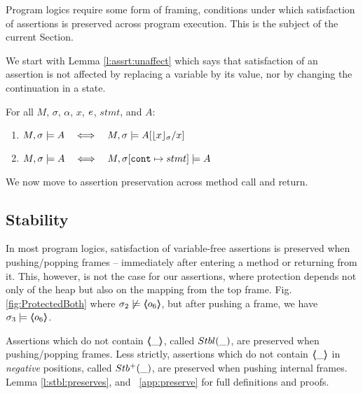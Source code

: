 Program logics require some form of framing, \ie conditions under which  satisfaction of  assertions is preserved across program execution. 
This is the subject of the current Section.

We start with  Lemma \ref{l:assrt:unaffect}  which says that satisfaction of an assertion is not affected by replacing a variable by its value, nor by changing the continuation in a state.


\begin{lemma}
\label{lemma:addr:expr}
\label{l:assrt:unaffect}
For all $M$, $\sigma$, $\alpha$, $x$, $\mathit{e}$, $stmt$, and $A$:

\begin{enumerate}
\item
\label{one:ad:exp}
\label{l:assrt:unaffect:one}
$\satisfiesA{M}{\sigma}{A}   \ \ \ \Longleftrightarrow\ \ \ \satisfiesA{M}{\sigma}{A[{\interpret \sigma x}/x]}   $ 
\item
$ \satisfiesA{M}{\sigma}{A}   \ \ \ \Longleftrightarrow\ \ \ \satisfiesA{M}{\sigma[\prg{cont}\mapsto stmt]}{A}$ 
\end{enumerate}

\end{lemma}

 \noindent
We now move to assertion preservation across method call and return. %

\subsection{Stability} %
\label{s:preserve:call:ret}
In most program logics, satisfaction of  variable-free assertions  is preserved when pushing/popping frames
-- \ie immediately after entering a method or  returning from it.
This, however, is not   the case for our assertions, where protection depends not only of the heap but also 
on the mapping from the top frame. \Eg  Fig. \ref{fig:ProtectedBoth} where 
$\sigma_2 \not\models \langle\!\!\langle o_6 \rangle\!\!\rangle$, but after pushing a frame, we have $\sigma_3  \models \langle\!\!\langle o_6 \rangle\!\!\rangle$.
 
 

{Assertions} which do  not contain  $\langle\!\!\langle \_ \rangle\!\!\rangle$, called   ${Stbl( \_ )}$, are preserved when pushing/popping  frames.  
{Less strictly}, assertions which do  not contain $\langle\!\!\langle \_ \rangle\!\!\rangle$ in \emph{negative} positions, called ${Stb^+( \_ )}$,  are preserved when pushing  {internal} frames.
\Cf  Lemma \ref{l:stbl:preserves}, and 
    \A\ \ref{app:preserve} for full definitions and proofs. 

